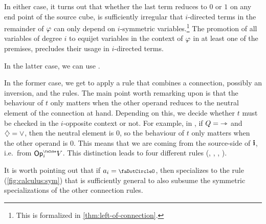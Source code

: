 \documentclass[a4paper]{memoir}
\begin{document}
In either case, it turns out that whether the last term reduces to $0$ or $1$ on any end point of the source cube, is sufficiently irregular that $i$-directed terms in the remainder of $\varphi$ can only depend on $i$-symmetric variables.\footnote{This is formalized in \cref{thm:left-of-connection}.}
The promotion of all variables of degree $i$ to equijet variables in the context of $\varphi$ in at least one of the premises, precludes their usage in $i$-directed terms.

In the latter case, we can use .

In the former case, we get to apply a rule that combines a connection, possibly an inversion, and the  rules.
The main point worth remarking upon is that the behaviour of $t$ only matters when the other operand reduces to the neutral element of the connection at hand.
Depending on this, we decide whether $t$ must be checked in the $i$-opposite context or not.
For example, in , if $Q = {\rightarrowtriangle}$ and $\mathbin{\diamondsuit} = \vee$, then the neutral element is $0$, so the behaviour of $t$ only matters when the other operand is $0$.
This means that we are coming from the source-side of $\mathbf{i}$, i.e.\ from $\Opcube_i V$.
This distinction leads to four different rules (, , , ).

It is worth pointing out that if $a_i = \npolar$, then  specializes to the rule  (\cref{fig:calculus:sym}) that is sufficiently general to also subsume the symmetric specializations of the other connection rules.
\end{document}
